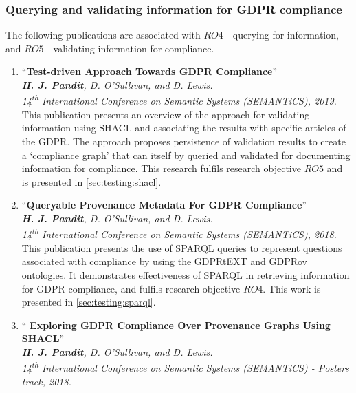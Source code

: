 \subsubsection{Querying and validating information for GDPR compliance}
The following publications are associated with $RO4$ - querying for information, and $RO5$ - validating information for compliance.
\begin{enumerate}[resume]
    \item ``\textbf{Test-driven Approach Towards GDPR Compliance}'' \cite{pandit_test-driven_2019} \\
    \textit{\textbf{H. J. Pandit}, D. O’Sullivan, and D. Lewis.} \\ 
    \textit{14\textsuperscript{th} International Conference on Semantic Systems (SEMANTiCS), 2019.}
        \vspace{0.1cm} \newline
        This publication presents an overview of the approach for validating information using SHACL and associating the results with specific articles of the GDPR. The approach proposes persistence of validation results to create a `compliance graph' that can itself by queried and validated for documenting information for compliance. This research fulfils research objective $RO5$ and is presented in \autoref{sec:testing:shacl}.
    \item ``\textbf{Queryable Provenance Metadata For GDPR Compliance}'' \cite{pandit_queryable_2018} \\
    \textit{\textbf{H. J. Pandit}, D. O’Sullivan, and D. Lewis.} \\ 
    \textit{14\textsuperscript{th} International Conference on Semantic Systems (SEMANTiCS), 2018.}
        \vspace{0.1cm} \newline
        This publication presents the use of SPARQL queries to represent questions associated with compliance by using the GDPRtEXT and GDPRov ontologies.
        It demonstrates effectiveness of SPARQL in retrieving information for GDPR compliance, and fulfils research objective $RO4$. This work is presented in \autoref{sec:testing:sparql}.
    \item ``\textbf{ Exploring GDPR Compliance Over Provenance Graphs Using SHACL}'' \cite{pandit_exploring_2018} \\
    \textit{\textbf{H. J. Pandit}, D. O’Sullivan, and D. Lewis.} \\ 
    \textit{14\textsuperscript{th} International Conference on Semantic Systems (SEMANTiCS) - Posters track, 2018.}

\end{enumerate}
